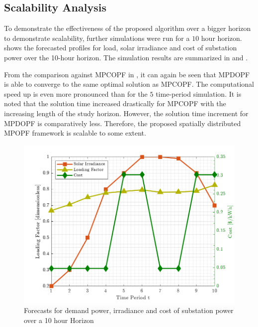 \documentclass[../../outputs/main.tex]{subfiles}
\begin{document}
\subsection{Scalability Analysis} \label{subsec:scalabilityAnalysis}

To demonstrate the effectiveness of the proposed algorithm over a bigger horizon to demonstrate scalability, further simulations were run for a $10$ hour horizon.  shows the forecasted profiles for load, solar irradiance and cost of substation power over the 10-hour horizon. The simulation results are summarized in  and .

From the comparison against MPCOPF in , it can again be seen that MPDOPF is able to converge to the same optimal solution as MPCOPF. The computational speed up is even more pronounced than for the $5$ time-period simulation. It is noted that the solution time increased drastically for MPCOPF with the increasing length of the study horizon. However, the solution time increment for MPDOPF is comparatively less. Therefore, the proposed spatially distributed MPOPF framework is scalable to some extent.


\begin{figure}[t]
    \centering
    \includegraphics[height=0.25\textheight]{../figures/T10-inputCurves/InputCurves_Horizon_10.png}
    \caption{Forecasts for demand power, irradiance and cost of substation power over a 10 hour Horizon}
    \label{fig:inputCurve-10}
\end{figure}
\end{document}
